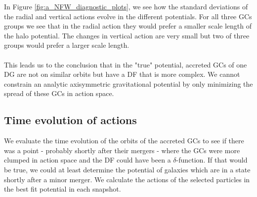 In Figure \ref{fig:a_NFW_diagnostic_plots}, we see how the standard deviations of the radial and vertical actions evolve in the different potentials. For all three \acp{GC} groups we see that in the radial action they would prefer a smaller scale length of the halo potential. The changes in vertical action are very small but two of three groups would prefer a larger scale length. 
\\\\This leads us to the conclusion that in the "true" potential, accreted \acp{GC} of one \ac{DG} are not on similar orbits but have a \ac{DF} that is more complex. We cannot constrain an analytic axisymmetric gravitational potential by only minimizing the spread of these \acp{GC} in action space.

\subsection{Time evolution of actions}\label{subsec:time_evo_actions}
We evaluate the time evolution of the orbits of the accreted \acp{GC} to see if there was a point - probably shortly after their mergers - where the \acp{GC} were more clumped in action space and the \ac{DF} could have been a $\delta$-function. If that would be true, we could at least determine the potential of galaxies which are in a state shortly after a minor merger. We calculate the actions of the selected particles in the best fit potential in each snapshot.  


